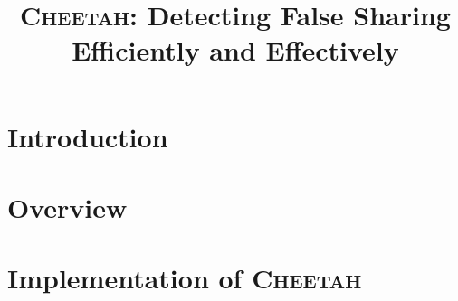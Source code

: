 \documentclass{sig-alternate}
\date{} %
\newcommand{\punt}[1]{}
\newcommand{\Cheetah}{{\scshape Cheetah}}
\begin{document}

\title{{\huge \bf \Cheetah{}}: Detecting False Sharing Efficiently and Effectively}

\begin{comment}
\authorinfo{Tongping~Liu \and Emery~D.~Berger}
{School of Computer Science \\
University of Massachusetts Amherst \\
Amherst, MA 01003 \\
{\{tonyliu,emery\}@cs.umass.edu}
}
\end{comment}

\maketitle

\begin{abstract}


\end{abstract}



\punt{
\category{D.1.3}{Programming Techniques}{Concurrent Programming--Parallel Programming}
\category{D.2.5}{Software Engineering}{Testing and Debugging--Debugging Aids}

\terms
Design, Reliability, Performance

\keywords
False Sharing, Detection Tools, Performance 
}



\section{Introduction}


\section{Overview}



\section{Implementation of \Cheetah{}}

\end{document}
